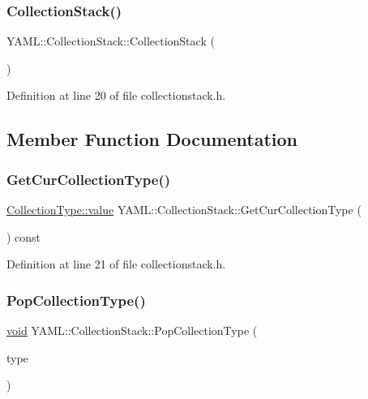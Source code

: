 \subsubsection{\texorpdfstring{CollectionStack()}{CollectionStack()}}
{\footnotesize\ttfamily Y\+A\+M\+L\+::\+Collection\+Stack\+::\+Collection\+Stack (\begin{DoxyParamCaption}{ }\end{DoxyParamCaption})\hspace{0.3cm}{\ttfamily [inline]}}



Definition at line 20 of file collectionstack.\+h.



\subsection{Member Function Documentation}
\mbox{\label{class_y_a_m_l_1_1_collection_stack_af7d0e9804e21e85c8674118ddf636c34}} 
\subsubsection{\texorpdfstring{GetCurCollectionType()}{GetCurCollectionType()}}
{\footnotesize\ttfamily \mbox{\hyperlink{struct_y_a_m_l_1_1_collection_type_a58f952b2cc7ebfe8423b5f50ed759bad}{Collection\+Type\+::value}} Y\+A\+M\+L\+::\+Collection\+Stack\+::\+Get\+Cur\+Collection\+Type (\begin{DoxyParamCaption}{ }\end{DoxyParamCaption}) const\hspace{0.3cm}{\ttfamily [inline]}}



Definition at line 21 of file collectionstack.\+h.

\mbox{\label{class_y_a_m_l_1_1_collection_stack_a6429d74502e07015ec4e9f98a2602e62}} 
\subsubsection{\texorpdfstring{PopCollectionType()}{PopCollectionType()}}
{\footnotesize\ttfamily \mbox{\hyperlink{glad_8h_a950fc91edb4504f62f1c577bf4727c29}{void}} Y\+A\+M\+L\+::\+Collection\+Stack\+::\+Pop\+Collection\+Type (\begin{DoxyParamCaption}\item[{\mbox{\hyperlink{struct_y_a_m_l_1_1_collection_type_a58f952b2cc7ebfe8423b5f50ed759bad}{Collection\+Type\+::value}}}]{type }\end{DoxyParamCaption})\hspace{0.3cm}{\ttfamily [inline]}}



